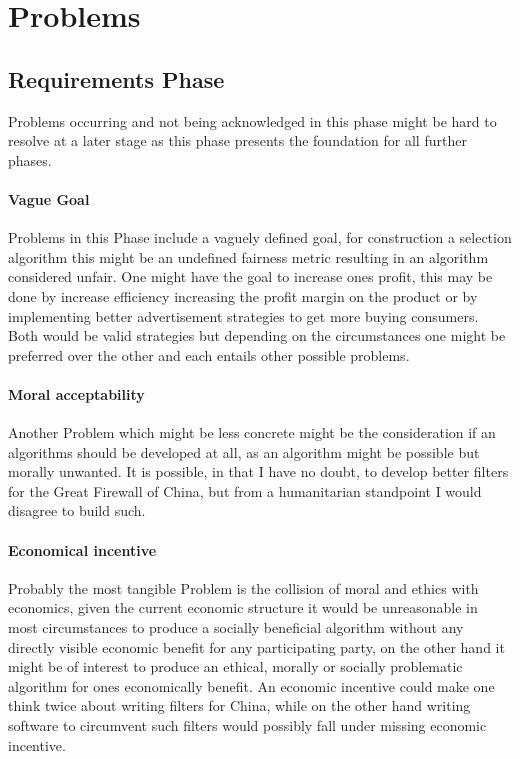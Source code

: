 \section{Problems}

\subsection{Requirements Phase}
Problems occurring and not being acknowledged in this phase
might be hard to resolve at a later stage as this phase presents the 
foundation for all further phases. 

\paragraph{Vague Goal}
Problems in this Phase include a vaguely defined goal,
for construction a selection algorithm this might be 
an undefined fairness metric resulting in an algorithm considered unfair.
One might have the goal to increase ones profit, this may be done by increase efficiency increasing the profit margin on the product or by implementing better
advertisement strategies to get more buying consumers. Both would be valid strategies but depending on the circumstances one might be preferred over the other and each entails other possible problems.

\paragraph{Moral acceptability}
Another Problem which might be less concrete might be the consideration if an algorithms should be developed at all,
as an algorithm might be possible but morally unwanted.
It is possible, in that I have no doubt, to develop better filters for the Great Firewall of China, but from a humanitarian standpoint I would disagree to build such.

\paragraph{Economical incentive}
Probably the most tangible Problem is the collision of moral and ethics with economics, given the current economic structure it would be unreasonable in most circumstances to produce a socially beneficial algorithm without any directly visible economic benefit for any participating party, on the other hand it might be of interest to produce an ethical, morally or socially problematic algorithm for ones economically benefit. 
An economic incentive could make one think twice about writing filters for China, while on the other hand
writing software to circumvent such filters would possibly fall under 
missing economic incentive.


